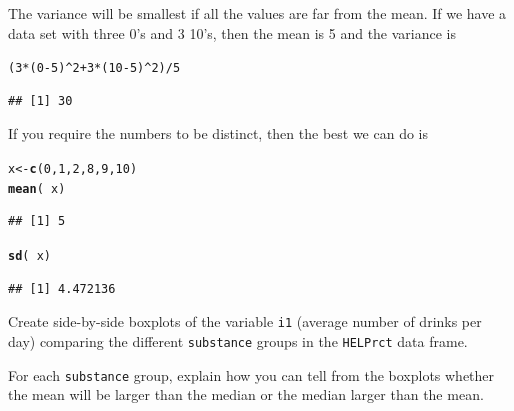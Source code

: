 \documentclass[twoside]{book}\usepackage[]{graphicx}\usepackage[]{xcolor}
\makeatletter
\newcommand{\hlnum}[1]{\textcolor[rgb]{0.686,0.059,0.569}{#1}}%
\newcommand{\hlopt}[1]{\textcolor[rgb]{0,0,0}{#1}}%
\newcommand{\hlstd}[1]{\textcolor[rgb]{0.345,0.345,0.345}{#1}}%
\newcommand{\hlkwb}[1]{\textcolor[rgb]{0.69,0.353,0.396}{#1}}%
\newcommand{\hlkwd}[1]{\textcolor[rgb]{0.737,0.353,0.396}{\textbf{#1}}}%
\newenvironment{kframe}{%
 \def\at@end@of@kframe{}%
 \ifinner\ifhmode%
  \def\at@end@of@kframe{\end{minipage}}%
  \begin{minipage}{\columnwidth}%
 \fi\fi%
 \def\FrameCommand##1{\hskip\@totalleftmargin \hskip-\fboxsep
 \colorbox{shadecolor}{##1}\hskip-\fboxsep
     \hskip-\linewidth \hskip-\@totalleftmargin \hskip\columnwidth}%
 \MakeFramed {\advance\hsize-\width
   \@totalleftmargin\z@ \linewidth\hsize
   \@setminipage}}%
 {\par\unskip\endMakeFramed%
 \at@end@of@kframe}
\newenvironment{knitrout}{}{} %
\newcommand{\variable}[1]{{\color{green!50!black}\texttt{#1}}}
\newcommand{\Rindex}[1]{\index{\texttt{#1}}}
\newcommand{\dataframe}[1]{{\color{blue!80!black}\texttt{#1}}\Rindex{#1}}
\makeatother
\begin{document}
\begin{solution}
	The variance will be smallest if all the values are far from the mean.
	If we have a data set with three 0's and 3 10's, then the mean is 5 and the 
	variance is
\begin{knitrout}
\color{fgcolor}\begin{kframe}
\begin{alltt}
\hlstd{(} \hlnum{3}\hlopt{*}\hlstd{(}\hlnum{0}\hlopt{-}\hlnum{5}\hlstd{)}\hlopt{^}\hlnum{2} \hlopt{+} \hlnum{3}\hlopt{*}\hlstd{(}\hlnum{10}\hlopt{-}\hlnum{5}\hlstd{)}\hlopt{^}\hlnum{2} \hlstd{)} \hlopt{/} \hlnum{5}
\end{alltt}
\begin{verbatim}
## [1] 30
\end{verbatim}
\end{kframe}
\end{knitrout}
	If you require the numbers to be distinct, then the best we can do is
\begin{knitrout}
\color{fgcolor}\begin{kframe}
\begin{alltt}
\hlstd{x} \hlkwb{<-} \hlkwd{c}\hlstd{(}\hlnum{0}\hlstd{,}\hlnum{1}\hlstd{,}\hlnum{2}\hlstd{,}\hlnum{8}\hlstd{,}\hlnum{9}\hlstd{,}\hlnum{10}\hlstd{)}
\hlkwd{mean}\hlstd{(}\hlopt{~}\hlstd{x)}
\end{alltt}
\begin{verbatim}
## [1] 5
\end{verbatim}
\begin{alltt}
\hlkwd{sd}\hlstd{(}\hlopt{~}\hlstd{x)}
\end{alltt}
\begin{verbatim}
## [1] 4.472136
\end{verbatim}
\end{kframe}
\end{knitrout}
\end{solution}

\begin{problem}
	Create side-by-side boxplots of the variable \variable{i1} (average number of
	drinks per day) comparing the different \variable{substance} groups
	in the \dataframe{HELPrct} data frame.

	For each \variable{substance} group, explain how you can tell from the 
	boxplots whether the mean will be larger than the median or the median 
	larger than the mean.
\end{problem}
\end{document}
